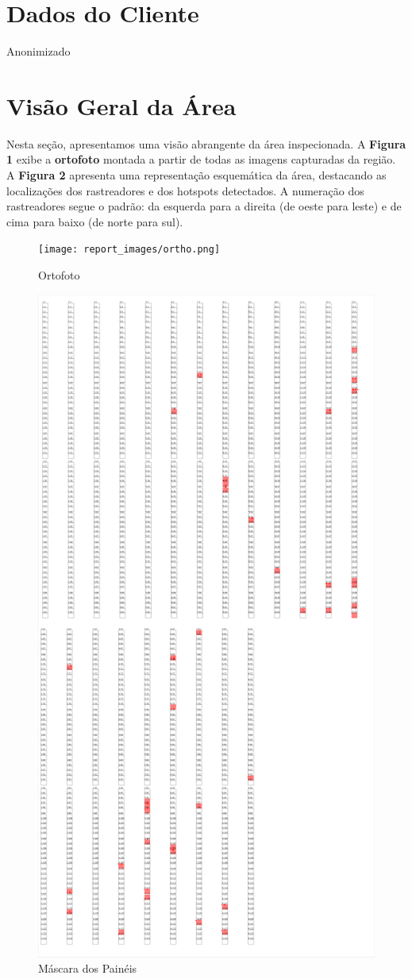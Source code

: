 \documentclass[dvipsnames]{article}%
\begin{document}
%
\section{Dados do Cliente}%
Anonimizado%
\section{Visão Geral da Área}%
 Nesta seção, apresentamos uma visão abrangente da área inspecionada. A \textbf{Figura 1} exibe a \textbf{ortofoto} montada a partir de todas as imagens capturadas da região. A \textbf{Figura 2} apresenta uma representação esquemática da área, destacando as localizações dos rastreadores e dos hotspots detectados. A numeração dos rastreadores segue o padrão: da esquerda para a direita (de oeste para leste) e de cima para baixo (de norte para sul).%
\FloatBarrier%


\begin{figure}[h!]%
\centering%
\texttt{[image: report\_images/ortho.png]}%
\caption{Ortofoto}%
\end{figure}

%
\FloatBarrier%


\begin{figure}[h!]%
\centering%
\includegraphics[width=0.6\linewidth]{report_images/layer_img.pdf}%
\caption{Máscara dos Painéis}%
\end{figure}
\end{document}

